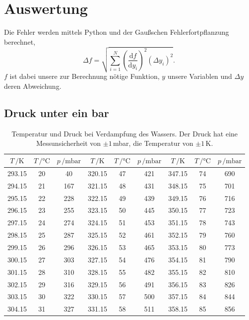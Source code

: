 \section{Auswertung}
\label{sec:Auswertung}
Die Fehler werden mittels Python und der Gaußschen Fehlerfortpflanzung berechnet,
\begin{equation}
\Delta f=\sqrt{\sum_{i=1}^N\left(\frac{\text{d}f}{\text{d}y_i}\right)^2(\Delta y_i)^2}.
\label{eq:Gauß}
\end{equation}
$f$ ist dabei unsere zur Berechnung nötige Funktion, $y$ unsere Variablen und $\Delta y$ deren Abweichung.
\subsection{Druck unter ein bar}
\begin{table}
  \centering
  \caption{Temperatur und Druck bei Verdampfung des Wassers. Der Druck hat eine Messunsicherheit von
  $\pm1$\,mbar, die Temperatur von $\pm 1$\,K.}
  \label{tab:Messreihe_1}
  \begin{tabular}{
  c c c||c c c||c c c
}
\toprule 
$T\,/ \unit{\kelvin}$ & $T\,/ \unit{\celsius}$ & $p\,/ \text{mbar}$ &
$T\,/ \unit{\kelvin}$ & $T\,/ \unit{\celsius}$ & $p\,/ \text{mbar}$ &
$T\,/ \unit{\kelvin}$ & $T\,/ \unit{\celsius}$ & $p\,/ \text{mbar}$ \\
\midrule
293.15 & 20 & 40  & 320.15 & 47 & 421 & 347.15 & 74 & 690 \\
294.15 & 21 & 167 & 321.15 & 48 & 431 & 348.15 & 75 & 701 \\    
295.15 & 22 & 228 & 322.15 & 49 & 439 & 349.15 & 76 & 716 \\                      
296.15 & 23 & 255 & 323.15 & 50 & 445 & 350.15 & 77 & 723 \\      
297.15 & 24 & 274 & 324.15 & 51 & 453 & 351.15 & 78 & 743 \\      
298.15 & 25 & 287 & 325.15 & 52 & 461 & 352.15 & 79 & 760 \\      
299.15 & 26 & 296 & 326.15 & 53 & 465 & 353.15 & 80 & 773 \\      
300.15 & 27 & 303 & 327.15 & 54 & 476 & 354.15 & 81 & 790 \\     
301.15 & 28 & 310 & 328.15 & 55 & 482 & 355.15 & 82 & 810 \\  
302.15 & 29 & 316 & 329.15 & 56 & 491 & 356.15 & 83 & 826 \\  
303.15 & 30 & 322 & 330.15 & 57 & 500 & 357.15 & 84 & 844 \\
304.15 & 31 & 327 & 331.15 & 58 & 511 & 358.15 & 85 & 856 \\

\end{tabular}
\end{table}
